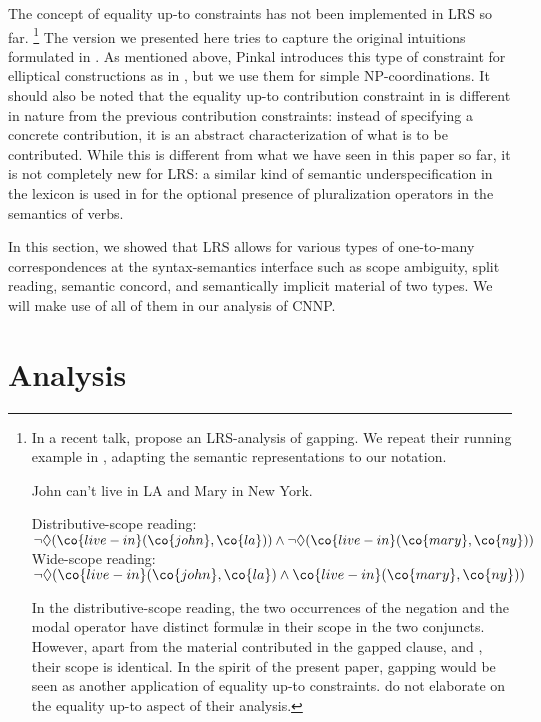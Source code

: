 \documentclass[output=paper]{langsci/langscibook}
\begin{document}
The concept of equality up-to constraints has not been implemented in LRS so far.%
\footnote{In a recent talk, \citet{Park:al:18} propose an LRS-analysis of gapping. We repeat their running example in , adapting the semantic representations to our notation.

\ea \label{gapping}
John can't live in LA and Mary in New York.
\begin{xlist}
\ex Distributive-scope reading:
$\lnot \Diamond (\co{live-in}(\co{john},\co{la}))
\land \lnot \Diamond (\co{live-in}(\co{mary},\co{ny}))$
\ex Wide-scope reading: 
$\lnot \Diamond (\co{live-in}(\co{john},\co{la}) 
\land \co{live-in}(\co{mary},\co{ny}))$
\end{xlist}
\z 

In the distributive-scope reading, the two occurrences of the negation and the modal operator have distinct formulæ in their scope in the two conjuncts. However, apart from the material contributed in the gapped clause,  and , their scope is identical. In the spirit of the present paper, gapping would be seen as another application of equality up-to constraints. \citet{Park:al:18} do not elaborate on the equality up-to aspect of their analysis.}
The version we presented here tries to capture the original intuitions formulated in \citet{Pinkal:99}. 
As mentioned above, Pinkal introduces this type of constraint for elliptical constructions as in , but we use them for simple NP-coordinations. 
It should also be noted that the equality up-to contribution constraint in  is different in nature from the previous contribution constraints:
instead of specifying a concrete contribution, it is an abstract characterization of what is to be contributed. 
While this is different from what we have seen in this paper so far, it is not completely new for LRS: a similar kind of semantic underspecification in the lexicon is used 
in \citet{Lahm:18} for the optional presence of pluralization operators in the semantics of verbs. 

In this section, we showed that LRS allows for various types of one-to-many correspondences at the syntax-semantics interface such as 
scope ambiguity, split reading, semantic concord, and semantically implicit material of two types.
We will make use of all of them in our analysis of CNNP.

\section{Analysis}\label{Sec-Analysis}
\end{document}
